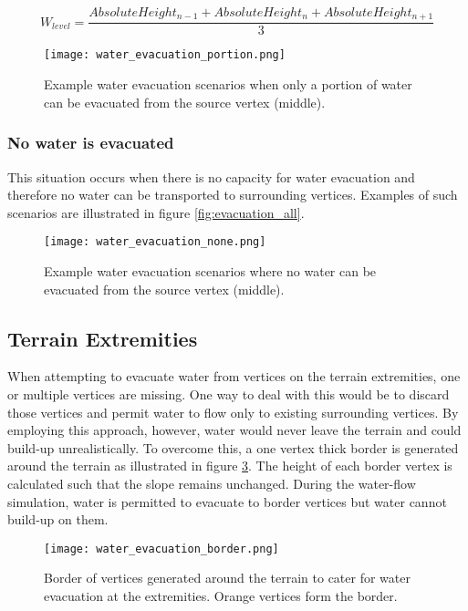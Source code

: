 \begin{equation} \label{eq:water_level_calc}
	W_{level} = \frac{AbsoluteHeight_{n-1} + AbsoluteHeight_{n} + AbsoluteHeight_{n+1}}{3}
\end{equation}

\begin{figure}
\center
	\texttt{[image: water\_evacuation\_portion.png]}
	\caption{ Example water evacuation scenarios when only a portion of water can be evacuated from the source vertex (middle).}
	\label{fig:evacuation_portion}
\end{figure}

\subsubsection{No water is evacuated}

This situation occurs when there is no capacity for water evacuation and therefore no water can be transported to surrounding vertices. Examples of such scenarios are illustrated in figure \ref{fig:evacuation_all}.

\begin{figure}
\center
	\texttt{[image: water\_evacuation\_none.png]}
	\caption{ Example water evacuation scenarios where no water can be evacuated from the source vertex (middle).}
	\label{fig:evacuation_none}
\end{figure}

\subsection{Terrain Extremities} \label{subsec:terrain_extremeties}

When attempting to evacuate water from vertices on the terrain extremities, one or multiple vertices are missing. One way to deal with this would be to discard those vertices and permit water to flow only to existing surrounding vertices. By employing this approach, however, water would never leave the terrain and could build-up unrealistically. To overcome this, a one vertex thick border is generated around the terrain as illustrated in figure \ref{fig:evacuation_border}. The height of each border vertex is calculated such that the slope remains unchanged. During the water-flow simulation, water is permitted to evacuate to border vertices but water cannot build-up on them.

\begin{figure}
\center
	\texttt{[image: water\_evacuation\_border.png]}
	\caption{ Border of vertices generated around the terrain to cater for water evacuation at the extremities. Orange vertices form the border. }
	\label{fig:evacuation_border}
\end{figure}

